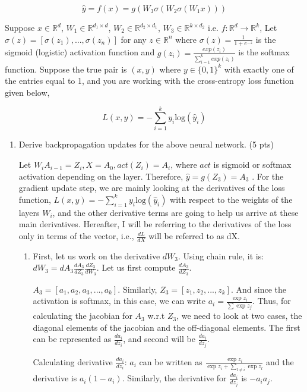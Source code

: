 \documentclass[a4paper]{article}
\theoremstyle{definition}
\newenvironment{soln}{
    \leavevmode\color{blue}\ignorespaces
}{}
\begin{document}
\[
\hat{y} = f(x) = g(W_3\sigma(W_2\sigma(W_1x)))
\]

Suppose $x \in \mathbb{R}^d$, $W_1 \in \mathbb{R}^{d_1 \times d}$, $W_2 \in \mathbb{R}^{d_2 \times d_1}$, $W_3 \in \mathbb{R}^{k \times d_2}$ i.e. $f: \mathbb{R}^d \rightarrow \mathbb{R}^k$, Let $\sigma(z) = [\sigma(z_1), ..., \sigma(z_n)]$ for any $z \in \mathbb{R}^n$ where $\sigma(z) = \frac{1}{1 + e^{-z}}$ is the sigmoid (logistic) activation function and $g(z_i) = \frac{exp(z_i)}{\sum_{i=1}^k exp(z_i)}$ is the softmax function. Suppose the true pair is $(x, y)$ where $y \in \{0, 1\}^k$ with exactly one of the entries equal to 1, and you are working with the cross-entropy loss function given below,

\[
L(x, y) = -\sum_{i=1}^k y_i \text{log}(\hat{y}_i)
\]

\begin{enumerate}
    \item Derive backpropagation updates for the above neural network. (5 pts) \\
    \begin{soln}
        Let $W_iA_{i-1}=Z_i, X=A_0, act(Z_i)=A_i$, where $act$ is sigmoid or softmax activation depending on the layer. Therefore, $\hat{y}=g(Z_3)=A_3$ . For the gradient update step, we are mainly looking at the derivatives of the loss function, $L(x, y) = -\sum_{i=1}^k y_i \text{log}(\hat{y}_i)$ with respect to the weights of the layers $W_i$, and the other derivative terms are going to help us arrive at these main derivatives. Hereafter, I will be referring to the derivatives of the loss only in terms of the vector, i.e., $\frac{dL}{dX}$ will be referred to as dX.\\

        \begin{enumerate}
            \item First, let us work on the derivative $dW_3$. Using chain rule, it is: $dW_3=dA_3\frac{dA_3}{dZ_3}\frac{dZ_3}{dW_3}$. Let us first compute $\frac{dA_3}{dZ_3}$. 

        $A_3=[a_1,a_2,a_3,...,a_k]$. Similarly, $Z_3=[z_1,z_2,...,z_k]$. And since the activation is softmax, in this case, we can write $a_i=\frac{\exp{z_i}}{\sum \exp{z_j}}$. Thus, for calculating the jacobian for $A_3$ w.r.t $Z_3$, we need to look at two cases, the diagonal elements of the jacobian and the off-diagonal elements. The first can be represented as $\frac{da_i}{dz_i}$, and second will be $\frac{da_i}{dz_j}$.

        Calculating derivative $\frac{da_i}{dz_i}$:
        $a_i$ can be written as $\frac{\exp{z_i}}{\exp{z_i}+\sum_{l \neq i} \exp{z_l}}$ and the derivative is $a_i(1-a_i)$. 
        Similarly, the derivative for  $\frac{da_i}{dz_j}$ is $-a_ia_j$.


\end{enumerate}
\end{soln}
\end{enumerate}
\end{document}
